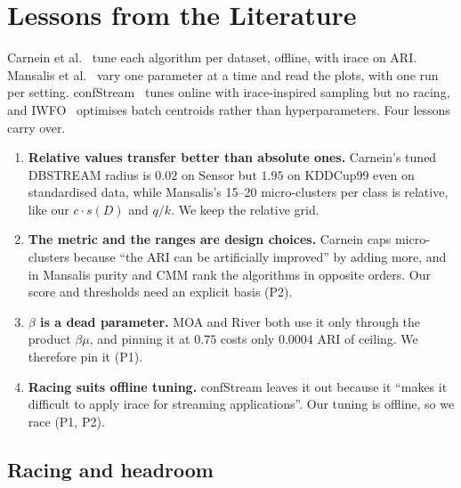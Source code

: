 \section{Lessons from the Literature}
\label{sec:lit}

Carnein et al.~\cite{carnein2017comparison} tune each algorithm per dataset, offline, with irace on ARI. Mansalis et al.~\cite{mansalis2018evaluation} vary one parameter at a time and read the plots, with one run per setting. confStream~\cite{carnein2020confstream} tunes online with irace-inspired sampling but no racing, and IWFO~\cite{thakral2024iwfo} optimises batch centroids rather than hyperparameters. Four lessons carry over.
\begin{enumerate}[label=\textbf{L\arabic*.},leftmargin=2em,itemsep=1pt,topsep=2pt]
  \item \textbf{Relative values transfer better than absolute ones.} Carnein's tuned DBSTREAM radius is $0.02$ on Sensor but $1.95$ on KDDCup99 even on standardised data, while Mansalis's 15--20 micro-clusters per class is relative, like our $c\cdot s(D)$ and $q/k$. We keep the relative grid.
  \item \textbf{The metric and the ranges are design choices.} Carnein caps micro-clusters because ``the ARI can be artificially improved'' by adding more, and in Mansalis purity and CMM rank the algorithms in opposite orders. Our score and thresholds need an explicit basis (P2).
  \item \textbf{$\beta$ is a dead parameter.} MOA and River both use it only through the product $\beta\mu$, and pinning it at $0.75$ costs only $0.0004$ ARI of ceiling. We therefore pin it (P1).
  \item \textbf{Racing suits offline tuning.} confStream leaves it out because it ``makes it difficult to apply irace for streaming applications''. Our tuning is offline, so we race (P1, P2).
\end{enumerate}

\subsection{Racing and headroom}
\label{sec:thresholds}


